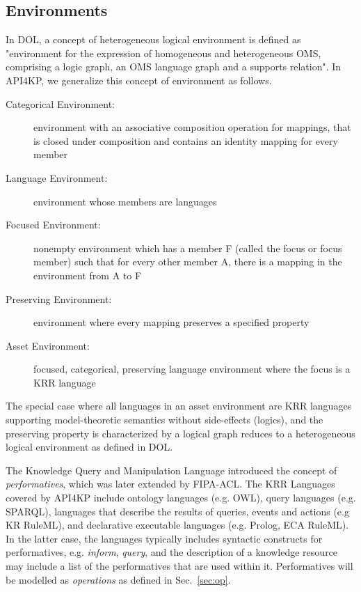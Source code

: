 \documentclass[runningheads]{llncs}
\begin{document}
\subsection{Environments}
In DOL, a concept of heterogeneous logical environment is defined as 
"environment for the
expression of homogeneous and heterogeneous OMS, comprising
a logic graph, an OMS language graph and a supports relation".
In API4KP, we generalize this concept of environment as follows.
\label{krassetenv}
\begin{description}
\item[Categorical Environment:] environment with an associative composition operation for mappings, that is closed under composition and contains an identity mapping for every member
\item[Language Environment:] environment whose members are languages
\item[Focused Environment:] nonempty environment which has a member F (called the focus or focus member) such that for every other member A, there is a mapping in the environment from A to F
\item[Preserving Environment:] environment where every mapping preserves a specified property
\item[Asset Environment:] focused, categorical, preserving language environment where the focus is a KRR language
\end{description}
The special case where all languages in an asset environment are KRR languages supporting model-theoretic semantics without side-effects (logics), and the preserving property is characterized by a logical graph reduces to a heterogeneous logical environment as defined in DOL.

The Knowledge Query and Manipulation Language\cite{Finin:1994:KAC:191246.191322} introduced the concept of \emph{performatives}, which was later extended by FIPA-ACL\cite{FIPA-ACL}.
The KRR Languages covered by API4KP include ontology languages (e.g. OWL), query languages (e.g. SPARQL), languages that describe the results of queries, events and actions (e.g KR RuleML), and declarative executable languages (e.g. Prolog, ECA RuleML). In the latter case, the languages typically includes syntactic constructs for performatives, e.g. \emph{inform}, \emph{query}, and the description of a knowledge resource may include a list of the performatives that are used within it.  Performatives will be modelled as \emph{operations} as defined in Sec.~\ref{sec:op}.
\end{document}
